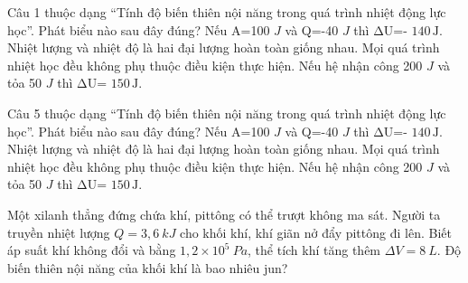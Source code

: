 \begin{ex}
Câu 1 thuộc dạng “Tính độ biến thiên nội năng trong quá trình nhiệt động lực học”. Phát biểu nào sau đây đúng?
\choice
{Nếu A=100 $J$ và Q=-40 $J$ thì ΔU=- $140\,\text{J}$.}
{Nhiệt lượng và nhiệt độ là hai đại lượng hoàn toàn giống nhau.}
{Mọi quá trình nhiệt học đều không phụ thuộc điều kiện thực hiện.}
{\True Nếu hệ nhận công 200 $J$ và tỏa 50 $J$ thì ΔU= $150\,\text{J}$.}
\end{ex}

\begin{ex}
Câu 5 thuộc dạng “Tính độ biến thiên nội năng trong quá trình nhiệt động lực học”. Phát biểu nào sau đây đúng?
\choice
{Nếu A=100 $J$ và Q=-40 $J$ thì ΔU=- $140\,\text{J}$.}
{Nhiệt lượng và nhiệt độ là hai đại lượng hoàn toàn giống nhau.}
{Mọi quá trình nhiệt học đều không phụ thuộc điều kiện thực hiện.}
{\True Nếu hệ nhận công 200 $J$ và tỏa 50 $J$ thì ΔU= $150\,\text{J}$.}
\end{ex}

\begin{ex}
Một xilanh thẳng đứng chứa khí, pittông có thể trượt không ma sát. Người ta truyền nhiệt lượng $Q = 3,6\ kJ$ cho khối khí, khí giãn nở đẩy pittông đi lên. Biết áp suất khí không đổi và bằng $1,2 \times 10^5\ Pa$, thể tích khí tăng thêm $\Delta V = 8\ L$. Độ biến thiên nội năng của khối khí là bao nhiêu jun?
\end{ex}

